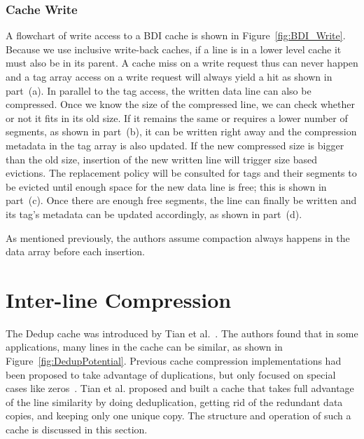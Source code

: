 \subsubsection{Cache Write}
A flowchart of write access to a BDI cache is shown in Figure~\ref{fig:BDI_Write}. Because we use inclusive write-back caches, if a line is in a lower level cache it must also be in its parent. A cache miss on a write request thus can never happen and a tag array access on a write request will always yield a hit as shown in part~(a). In parallel to the tag access, the written data line can also be compressed. Once we know the size of the compressed line, we can check whether or not it fits in its old size. If it remains the same or requires a lower number of segments, as shown in part~(b), it can be written right away and the compression metadata in the tag array is also updated. If the new compressed size is bigger than the old size, insertion of the new written line will trigger size based evictions. The replacement policy will be consulted for tags and their segments to be evicted until enough space for the new data line is free; this is shown in part~(c). Once there are enough free segments, the line can finally be written and its tag's metadata can be updated accordingly, as shown in part~(d).\par
As mentioned previously, the authors assume compaction always happens in the data array before each insertion.

\section{Inter-line Compression}
\label{sec:Dedup}
The Dedup cache was introduced by Tian et al.~\cite{dedup}. The authors found that in some applications, many lines in the cache can be similar, as shown in Figure~\ref{fig:DedupPotential}. Previous cache compression implementations had been proposed to take advantage of duplications, but only focused on special cases like zeros~\cite{alameldeen2004adaptive, dusser2009zero}. Tian et al. proposed and built a cache that takes full advantage of the line similarity by doing deduplication, getting rid of the redundant data copies, and keeping only one unique copy. The structure and operation of such a cache is discussed in this section.
